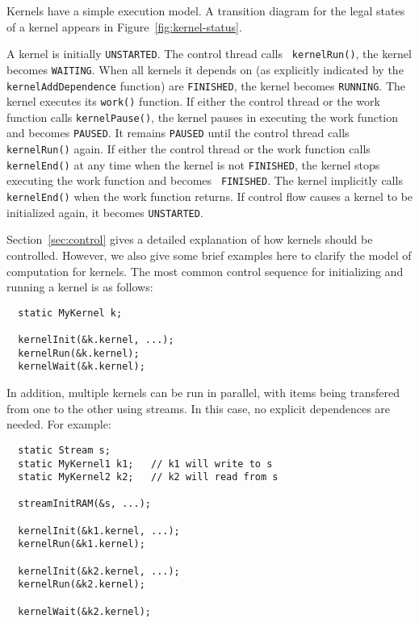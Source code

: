 
\begin{figure}[t]
\end{figure}

Kernels have a simple execution model. A transition diagram for the
legal states of a kernel appears in Figure~\ref{fig:kernel-status}.

A kernel is initially {\tt UNSTARTED}.  The control thread calls {\tt
kernelRun()}, the kernel becomes {\tt WAITING}.  When all kernels it
depends on (as explicitly indicated by the {\tt kernelAddDependence}
function) are {\tt FINISHED}, the kernel becomes {\tt RUNNING}. The
kernel executes its {\tt work()} function.  If either the control
thread or the work function calls {\tt kernelPause()}, the kernel
pauses in executing the work function and becomes {\tt PAUSED}. It
remains {\tt PAUSED} until the control thread calls {\tt kernelRun()}
again. If either the control thread or the work function calls {\tt
kernelEnd()} at any time when the kernel is not {\tt FINISHED}, the
kernel stops executing the work function and becomes {\tt
FINISHED}. The kernel implicitly calls {\tt kernelEnd()} when the work
function returns. If control flow causes a kernel to be initialized
again, it becomes {\tt UNSTARTED}.

Section~\ref{sec:control} gives a detailed explanation of how kernels
should be controlled.  However, we also give some brief examples here
to clarify the model of computation for kernels.  The most common
control sequence for initializing and running a kernel is as follows:

{\small
\begin{verbatim}
  static MyKernel k;

  kernelInit(&k.kernel, ...);
  kernelRun(&k.kernel);
  kernelWait(&k.kernel);
\end{verbatim}}

In addition, multiple kernels can be run in parallel, with items being
transfered from one to the other using streams.  In this case, no
explicit dependences are needed.  For example:

{\small
\begin{verbatim}
  static Stream s;
  static MyKernel1 k1;   // k1 will write to s
  static MyKernel2 k2;   // k2 will read from s

  streamInitRAM(&s, ...);

  kernelInit(&k1.kernel, ...);  
  kernelRun(&k1.kernel);

  kernelInit(&k2.kernel, ...);
  kernelRun(&k2.kernel);

  kernelWait(&k2.kernel);
\end{verbatim}}

